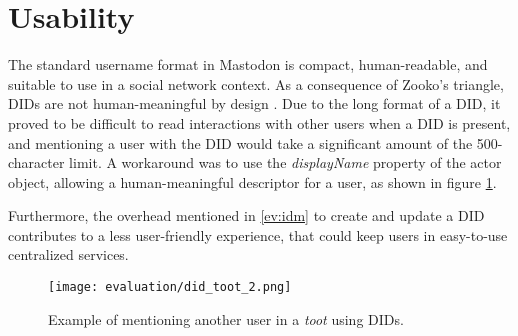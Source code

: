\section{Usability}
The standard username format in Mastodon is compact, human-readable, and suitable to use in a social network context. As a consequence of Zooko's triangle, DIDs are not human-meaningful by design \cite{wilcox-o'hearn_2001} \cite{sporny_longley_sabadello_reed_steele_2021}. Due to the long format of a DID, it proved to be difficult to read interactions with other users when a DID is present, and mentioning a user with the DID would take a significant amount of the 500-character limit. A workaround was to use the \emph{displayName} property of the actor object, allowing a human-meaningful descriptor for a user, as shown in figure \ref{fig:did_toot}.

Furthermore, the overhead mentioned in \ref{ev:idm} to create and update a DID contributes to a less user-friendly experience, that could keep users in easy-to-use centralized services. 


\begin{figure}[H]
  \centering
  \texttt{[image: evaluation/did\_toot\_2.png]}
  \caption{Example of mentioning another user in a \emph{toot} using DIDs.}
  \label{fig:did_toot}
\end{figure}